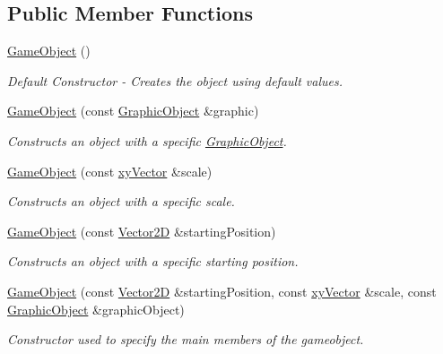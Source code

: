 \subsection*{Public Member Functions}
\begin{DoxyCompactItemize}
\item 
\mbox{\label{class_game_object_a0348e3ee2e83d56eafca7a3547f432c4}} 
\hyperlink{class_game_object_a0348e3ee2e83d56eafca7a3547f432c4}{Game\+Object} ()
\begin{DoxyCompactList}\small\item\em Default Constructor -\/ Creates the object using default values. \end{DoxyCompactList}\item 
\hyperlink{class_game_object_a780db39d3dc5b54c4dffe2f429f9b656}{Game\+Object} (const \hyperlink{class_graphic_object}{Graphic\+Object} \&graphic)
\begin{DoxyCompactList}\small\item\em Constructs an object with a specific \hyperlink{class_graphic_object}{Graphic\+Object}. \end{DoxyCompactList}\item 
\hyperlink{class_game_object_a93186927c126a290592e3d7c13906f18}{Game\+Object} (const \hyperlink{structxy_vector}{xy\+Vector} \&scale)
\begin{DoxyCompactList}\small\item\em Constructs an object with a specific scale. \end{DoxyCompactList}\item 
\hyperlink{class_game_object_a8a9022df605afb6be63d0dcca07667d6}{Game\+Object} (const \hyperlink{class_vector2_d}{Vector2D} \&starting\+Position)
\begin{DoxyCompactList}\small\item\em Constructs an object with a specific starting position. \end{DoxyCompactList}\item 
\mbox{\label{class_game_object_adc9ac2a346e947a0dd6f7bd94ecea8af}} 
\hyperlink{class_game_object_adc9ac2a346e947a0dd6f7bd94ecea8af}{Game\+Object} (const \hyperlink{class_vector2_d}{Vector2D} \&starting\+Position, const \hyperlink{structxy_vector}{xy\+Vector} \&scale, const \hyperlink{class_graphic_object}{Graphic\+Object} \&graphic\+Object)
\begin{DoxyCompactList}\small\item\em Constructor used to specify the main members of the gameobject. \end{DoxyCompactList}\item 

\end{DoxyCompactItemize}
